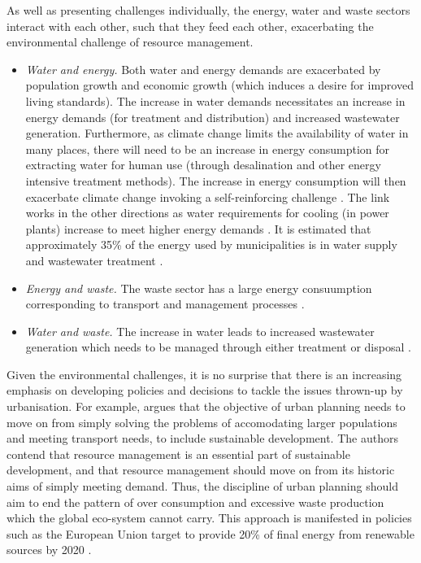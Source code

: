As well as presenting challenges individually, the energy, water and waste sectors interact with each other, such that they feed each other, exacerbating the environmental challenge of resource management. 
\begin{itemize}
	\item \emph{Water and energy.} Both water and energy demands are exacerbated by population growth and economic growth (which induces a desire for improved living standards). The increase in water demands necessitates an increase in energy demands (for treatment and distribution) and increased wastewater generation. Furthermore, as climate change limits the availability of water in many places, there will need to be an increase in energy consumption for extracting water for human use (through desalination and other energy intensive treatment methods). The increase in energy consumption will then exacerbate climate change invoking a self-reinforcing challenge \citep{Webber2011}. The link works in the other directions as water requirements for cooling (in power plants) increase to meet higher energy demands \citep{McMahon2011}. It is estimated that approximately 35\% of the energy used by municipalities is in water supply and wastewater treatment \citep{El2005}.
	\item \emph{Energy and waste.} The waste sector has a large energy consuumption corresponding to transport and management processes \citep{ICE2011}.
	\item \emph{Water and waste.} The increase in water leads to increased wastewater generation which needs to be managed through either treatment or disposal \citep{McMahon2011}. 
\end{itemize}

Given the environmental challenges, it is no surprise that there is an increasing emphasis on developing policies and decisions to tackle the issues thrown-up by urbanisation. For example, \citet{Agudelo-Vera2011} argues that the objective of urban planning needs to move on from simply solving the problems of accomodating larger populations and meeting transport needs, to include sustainable development. The authors contend that resource management is an essential part of sustainable development, and that resource management should move on from its historic aims of simply meeting demand. Thus, the discipline of urban planning should aim to end the pattern of over consumption and excessive waste production which the global eco-system cannot carry. This approach is manifested in policies such as the European Union target to provide 20\% of final energy from renewable sources by 2020 \citep{Keirstead2012}.

